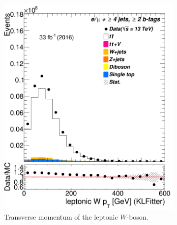 \begin{figure} %
	\centering
	
	\begin{subfigure}{0.35\textwidth}
		\includegraphics[width=\linewidth]{ControlPlots_emujets_2016_4incl_2incl/klf_Wlep_pt_emujets_2016.png}
		\caption{Transverse momentum of the leptonic $W$-boson.} \label{fig:411}
	\end{subfigure}
	\hspace*{1.5cm}
	\begin{subfigure}{0.35\textwidth}

\end{subfigure}
\end{figure}
